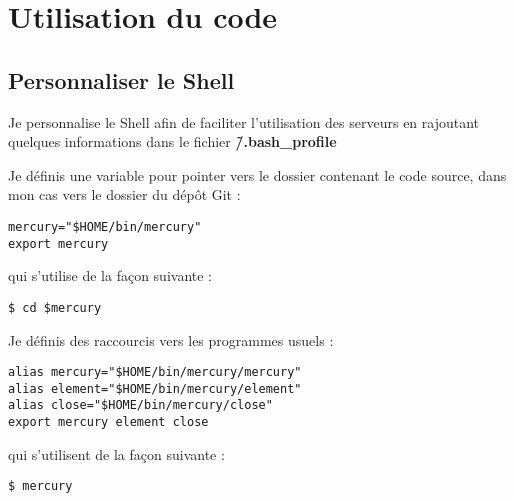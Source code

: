 \section{Utilisation du code}
\subsection{Personnaliser le Shell}
Je personnalise le Shell afin de faciliter l'utilisation des serveurs en rajoutant quelques informations dans le fichier \textbf{\~/.bash\_profile}

Je définis une variable pour pointer vers le dossier contenant le code source, dans mon cas vers le dossier du dépôt Git : 
\begin{verbatim}
mercury="$HOME/bin/mercury"
export mercury
\end{verbatim}
qui s'utilise de la façon suivante : 
\begin{verbatim}
$ cd $mercury
\end{verbatim}

\bigskip

Je définis des raccourcis vers les programmes usuels : 
\begin{verbatim}
alias mercury="$HOME/bin/mercury/mercury"
alias element="$HOME/bin/mercury/element"
alias close="$HOME/bin/mercury/close"
export mercury element close
\end{verbatim}
qui s'utilisent de la façon suivante : 
\begin{verbatim}
$ mercury
\end{verbatim}

\bigskip

